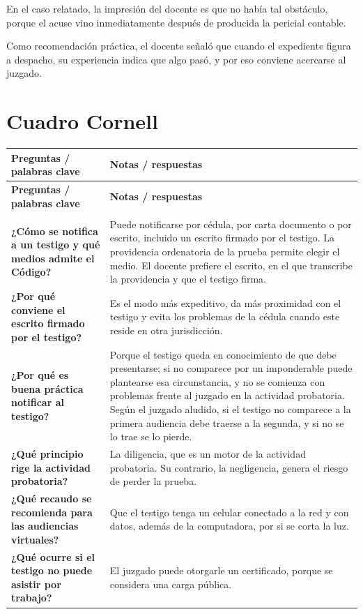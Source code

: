 \documentclass[12pt,oneside]{book}
\newlength{\cornellizq}
\newlength{\cornellder}
\newenvironment{cornell}
{\begin{longtable}{>{\columncolor{gray!10}\raggedright\arraybackslash}p{\cornellizq}>{\raggedright\arraybackslash}p{\cornellder}}
\toprule
\textbf{Preguntas / palabras clave} & \textbf{Notas / respuestas} \\
\midrule
\endfirsthead
\toprule
\textbf{Preguntas / palabras clave} & \textbf{Notas / respuestas} \\
\midrule
\endhead
\midrule
\multicolumn{2}{r}{\footnotesize\itshape Continúa en la página siguiente} \\
\endfoot
\endlastfoot}
{\end{longtable}}
\begin{document}
En el caso relatado, la impresión del docente es que no había tal obstáculo, porque el acuse vino inmediatamente después de producida la pericial contable.

\begin{note}
Como recomendación práctica, el docente señaló que cuando el expediente figura a despacho, su experiencia indica que algo pasó, y por eso conviene acercarse al juzgado.
\end{note}

\section{Cuadro Cornell}

\begin{cornell}
\textbf{¿Cómo se notifica a un testigo y qué medios admite el Código?} &
Puede notificarse por cédula, por carta documento o por escrito, incluido un escrito firmado por el testigo. La providencia ordenatoria de la prueba permite elegir el medio. El docente prefiere el escrito, en el que transcribe la providencia y que el testigo firma. \\
\addlinespace
\midrule[0.3pt]
\textbf{¿Por qué conviene el escrito firmado por el testigo?} &
Es el modo más expeditivo, da más proximidad con el testigo y evita los problemas de la cédula cuando este reside en otra jurisdicción. \\
\addlinespace
\midrule[0.3pt]
\textbf{¿Por qué es buena práctica notificar al testigo?} &
Porque el testigo queda en conocimiento de que debe presentarse; si no comparece por un imponderable puede plantearse esa circunstancia, y no se comienza con problemas frente al juzgado en la actividad probatoria. Según el juzgado aludido, si el testigo no comparece a la primera audiencia debe traerse a la segunda, y si no se lo trae se lo pierde. \\
\addlinespace
\midrule[0.3pt]
\textbf{¿Qué principio rige la actividad probatoria?} &
La diligencia, que es un motor de la actividad probatoria. Su contrario, la negligencia, genera el riesgo de perder la prueba. \\
\addlinespace
\midrule[0.3pt]
\textbf{¿Qué recaudo se recomienda para las audiencias virtuales?} &
Que el testigo tenga un celular conectado a la red y con datos, además de la computadora, por si se corta la luz. \\
\addlinespace
\midrule[0.3pt]
\textbf{¿Qué ocurre si el testigo no puede asistir por trabajo?} &
El juzgado puede otorgarle un certificado, porque se considera una carga pública. \\

\end{cornell}
\end{document}
